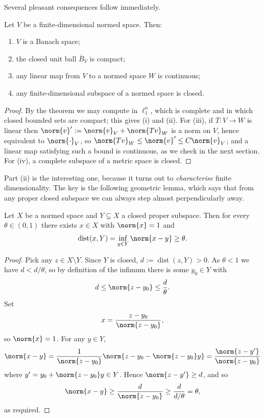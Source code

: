 \documentclass[a4paper]{scrartcl}
\DeclareMathOperator{\dist}{dist}
\begin{document}
Several pleasant consequences follow immediately.

\begin{corollary}
	Let $V$ be a finite-dimensional normed space. Then:
	\begin{enumerate}[label=(\roman*)]
		\item $V$ is a Banach space;
		\item the closed unit ball $\bar{B}_V$ is compact;
		\item any linear map from $V$ to a normed space $W$ is continuous;
		\item any finite-dimensional subspace of a normed space is closed.
	\end{enumerate}
\end{corollary}

\begin{proof}
	By the theorem we may compute in $\ell_1^n$, which is complete and in which closed bounded sets are compact; this gives (i) and (ii). For (iii), if $T : V \to W$ is linear then $\norm{v}' := \norm{v}_V + \norm{Tv}_W$ is a norm on $V$, hence equivalent to $\norm{\cdot}_V$, so $\norm{Tv}_W \leq \norm{v}' \leq C \norm{v}_V$; and a linear map satisfying such a bound is continuous, as we check in the next section. For (iv), a complete subspace of a metric space is closed.
\end{proof}

Part (ii) is the interesting one, because it turns out to \emph{characterise} finite dimensionality. The key is the following geometric lemma, which says that from any proper closed subspace we can always step almost perpendicularly away.

\begin{lemma}
	Let $X$ be a normed space and $Y \subsetneq X$ a closed proper subspace. Then for every $\theta \in (0,1)$ there exists $x \in X$ with $\norm{x} = 1$ and
	$$\dist(x, Y) = \inf_{y \in Y} \norm{x - y} \geq \theta.$$
\end{lemma}

\begin{proof}
	Pick any $z \in X \setminus Y$. Since $Y$ is closed, $d := \dist(z, Y) > 0$. As $\theta < 1$ we have $d < d/\theta$, so by definition of the infimum there is some $y_0 \in Y$ with
	$$d \leq \norm{z - y_0} \leq \frac{d}{\theta}.$$
	Set
	$$x = \frac{z - y_0}{\norm{z - y_0}},$$
	so $\norm{x} = 1$. For any $y \in Y$,
	$$\norm{x - y} = \frac{1}{\norm{z - y_0}} \norm{ z - y_0 - \norm{z - y_0} y } = \frac{\norm{z - y'}}{\norm{z-y_0}}$$
	where $y' = y_0 + \norm{z - y_0}y \in Y$. Hence $\norm{z - y'} \geq d$, and so
	$$\norm{x - y} \geq \frac{d}{\norm{z - y_0}} \geq \frac{d}{d/\theta} = \theta,$$
	as required.
\end{proof}
\end{document}

